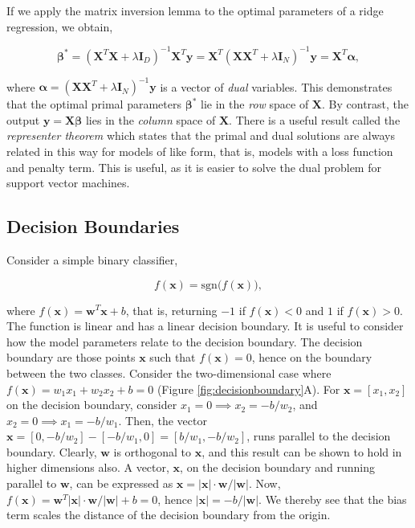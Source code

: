 \documentclass[11pt]{amsart}
\begin{document}
If we apply the matrix inversion lemma to the optimal parameters of a ridge regression, we obtain,

$$\boldsymbol{\beta}^* = (\mathbf{X}^T\mathbf{X} + \lambda\mathbf{I}_D)^{-1}\mathbf{X}^T\mathbf{y} = \mathbf{X}^T(\mathbf{X}\mathbf{X}^T + \lambda\mathbf{I}_N)^{-1}\mathbf{y} = \mathbf{X}^T\boldsymbol\alpha,$$

where $\boldsymbol\alpha = (\mathbf{X}\mathbf{X}^T + \lambda\mathbf{I}_N)^{-1}\mathbf{y}$ is a vector of \emph{dual} variables. This demonstrates that the optimal primal parameters $\boldsymbol\beta^*$ lie in the \emph{row} space of $\mathbf{X}$. By contrast, the output $\mathbf{y} = \mathbf{X}\boldsymbol\beta$ lies in the \emph{column} space of $\mathbf{X}$. There is a useful result called the \emph{representer theorem} which states that the primal and dual solutions are always related in this way for models of like form, that is, models with a loss function and penalty term. This is useful, as it is easier to solve the dual problem for support vector machines.

\subsection{Decision Boundaries}

Consider a simple binary classifier,

\begin{equation}
f(\mathbf{x}) = \text{sgn}\big(f(\mathbf{x})\big),
\label{eq:svmprimal}
\end{equation}

where $f(\mathbf{x}) = \mathbf{w}^T\mathbf{x} + b$, that is, returning $-1$ if $f(\mathbf{x}) < 0$ and $1$ if $f(\mathbf{x}) > 0$. The function is linear and has a linear decision boundary. It is useful to consider how the model parameters relate to the decision boundary. The decision boundary are those points $\mathbf{x}$ such that $f(\mathbf{x}) = 0$, hence on the boundary between the two classes. Consider the two-dimensional case where $f(\mathbf{x}) = w_1x_1 + w_2x_2 + b = 0$ (Figure \ref{fig:decisionboundary}A). For $\mathbf{x} = [x_1, x_2]$ on the decision boundary, consider $x_1 = 0 \implies x_2 = -b/w_2$, and $x_2 = 0 \implies x_1 = -b/w_1$. Then, the vector $\mathbf{x} = [0, -b/w_2] - [-b/w_1, 0] = [b/w_1, -b/w_2]$, runs parallel to the decision boundary. Clearly, $\mathbf{w}$ is orthogonal to $\mathbf{x}$, and this result can be shown to hold in higher dimensions also. A vector, $\mathbf{x}$, on the decision boundary and running parallel to $\mathbf{w}$, can be expressed as $\mathbf{x} = |\mathbf{x}|\cdot\mathbf{w}/|\mathbf{w}|$. Now, $f(\mathbf{x}) = \mathbf{w}^T|\mathbf{x}|\cdot\mathbf{w}/|\mathbf{w}| + b = 0$, hence $|\mathbf{x}| = -b/|\mathbf{w}|$. We thereby see that the bias term scales the distance of the decision boundary from the origin.
\end{document}
